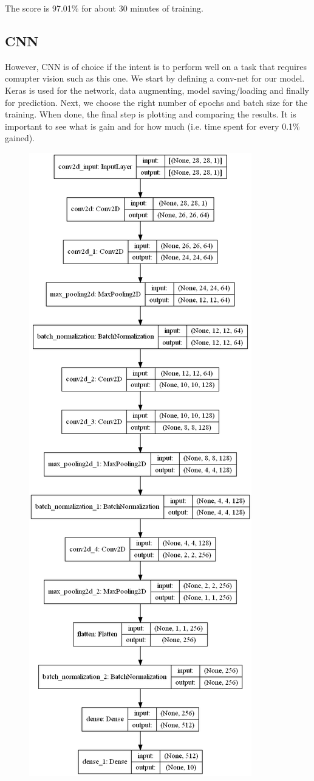 \documentclass{article}
\begin{document}
The score is 97.01\% for about 30 minutes of training.

\subsection{CNN}
However, CNN is of choice if the intent is to perform well on a task that
requires comupter vision such as this one. We start by defining a conv-net for
our model. Keras is used for the network, data augmenting, model saving/loading
and finally for prediction. Next, we choose the right number of epochs and batch
size for the training. When done, the final step is plotting and comparing the
results. It is important to see what is gain and for how much (i.e. time spent
for every 0.1\% gained).

\begin{figure}[!htbp]
  \centering
  \includegraphics[scale=0.3]{../plots/mnist-supervised-classification-image-cnn_keras-model.png}

\end{figure}
\end{document}
